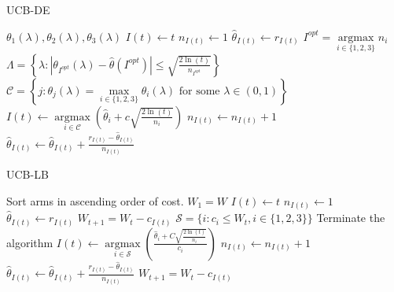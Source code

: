 \documentclass{article}
\begin{document}
\begin{algorithm}
\caption{UCB-DE}
\begin{algorithmic}[1]
    \Require $\theta_1(\lambda),\theta_2(\lambda),\theta_3(\lambda)$
    \State $I(t)\gets t$
    \State $n_{I(t)}\gets 1$
    \State $\hat{\theta}_{I(t)}\gets r_{I(t)}$
    \EndFor
    \State $I^{opt}=\mathop{\arg\max}\limits_{i\in\{1,2,3\}}n_i$
    \State $\Lambda=\left\{\lambda:|\theta_{I^{opt}}(\lambda)-\hat{\theta}({I^{opt}})|\leqslant\sqrt{\frac{2\ln(t)}{n_{I^{opt}}}}\right\}$
    \State $\mathcal{C}=\left\{j:\theta_j(\lambda)=\max\limits_{i\in\{1,2,3\}}\theta_i(\lambda)\text{ for some }\lambda\in(0,1)\right\}$
    \State $I(t)\gets\mathop{\arg\max}\limits_{i\in\mathcal{C}}\left(\hat{\theta}_i+c\sqrt{\frac{2\ln(t)}{n_i}}\right)$
    \State $n_{I(t)}\gets n_{I(t)}+1$
    \State $\hat{\theta}_{I(t)}\gets\hat{\theta}_{I(t)}+\frac{r_{I(t)}-\hat{\theta}_{I(t)}}{n_{I(t)}}$
    \EndFor
\end{algorithmic}
\end{algorithm}

\begin{algorithm}
\caption{UCB-LB}
\begin{algorithmic}[1]
    \Ensure Sort arms in ascending order of cost.
    \State $W_1=W$
    \State $I(t)\gets t$
    \State $n_{I(t)}\gets 1$
    \State $\hat{\theta}_{I(t)}\gets r_{I(t)}$
    \State $W_{t+1}=W_t-c_{I(t)}$
    \EndFor
    \State $\mathcal{S}=\Big\{i:c_i\leqslant W_t,i\in\{1,2,3\}\Big\}$
    \State Terminate the algorithm
    \EndIf
    \State $I(t)\gets\mathop{\arg\max}\limits_{i\in\mathcal{S}}\left(\frac{\hat{\theta}_i+C\sqrt{\frac{2\ln(t)}{n_i}}}{c_i}\right)$
    \State $n_{I(t)}\gets n_{I(t)}+1$
    \State $\hat{\theta}_{I(t)}\gets\hat{\theta}_{I(t)}+\frac{r_{I(t)}-\hat{\theta}_{I(t)}}{n_{I(t)}}$
    \State $W_{t+1}=W_t-c_{I(t)}$
    \EndFor
\end{algorithmic}
\end{algorithm}
\end{document}
